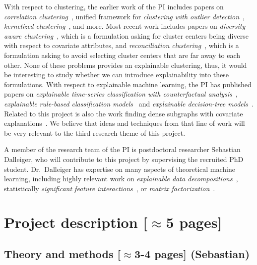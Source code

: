 \documentclass[a4paper,11pt]{article}
\begin{document}
With respect to clustering, 
the earlier work of the PI includes papers on
\emph{correlation clustering}~\cite{bonchi2013overlapping,gionis2007clustering},
unified framework for \emph{clustering with outlier detection}~\cite{chawla2013k},
\emph{kernelized clustering}~\cite{amid2015kernel}, and more.
Most recent work includes papers on
\emph{diversity-aware clustering}~\cite{thejaswi2021diversity}, 
which is a formulation asking for cluster centers being diverse with respect to covariate attributes, and
\emph{reconciliation clustering}~\cite{spoerhase2023constant}, 
which is a formulation asking to avoid selecting cluster centers that are far away to each other.
None of these problems provides an explainable clustering, 
thus, it would be interesting to study whether we can introduce explainability
into these formulations.
%
With respect to explainable machine learning, 
the PI has published papers on 
\emph{explainable time-series classification with counterfactual analysis}~\cite{karlsson2020locally},
\emph{explainable rule-based classification models}~\cite{ciaperoni2023concise,zhang2020diverse}
and 
\emph{explainable decision-tree models}~\cite{zhang2023regularized}. 
Related to this project is also the work
finding dense subgraphs with covariate explanations~\cite{galbrun2014overlapping,galbrun2016top}.
We believe that ideas and techniques from that line of work
will be very relevant to the third research theme of this project.

A member of the research team of the PI is postdoctoral researcher Sebastian Dalleiger, 
who will contribute to this project by supervising the recruited PhD student.
Dr.\ Dalleiger has expertise on many aspects of theoretical machine learning, 
including highly relevant work on \emph{explainable data decompositions}~\cite{dalleiger2020explainable},
statistically \emph{significant feature interactions}~\cite{}, or
\emph{matrix factorization}~\cite{}.

\section{Project description {\color{orange}[$\approx$5 pages]}}


\subsection{Theory and methods {\color{orange}[$\approx$3-4 pages]} {\color{teal}(Sebastian)}}
\end{document}
